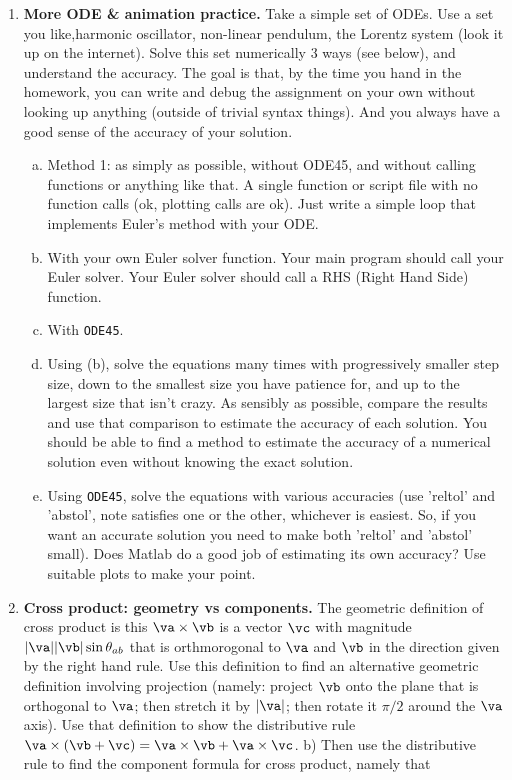 \documentclass[11pt]{article}
\def\tight{ \setlength{\itemsep}{1.5pt}\setlength{\parskip}{0pt}\setlength{\parsep}{0pt}}
\begin{document}
\begin{enumerate}
\begin{enumerate}[\bf a)]
\end{enumerate}

\item {\bf More ODE \& animation practice.}
Take a simple set of ODEs.  Use a set you like,\eg  harmonic oscillator, non-linear pendulum, the Lorentz system (look it up on the internet). Solve this set numerically 3 ways (see below), and understand the accuracy. The goal is that, by the time you hand in the homework, you can write and debug the assignment on your own without looking up anything (outside of trivial syntax things). And you always have a good sense of the accuracy of your solution.
\begin{enumerate}[a.]\tight
\item Method 1:  as simply as possible, without ODE45, and without calling functions or anything like that.  A single function or script file with no function calls (ok, plotting calls are ok). Just write a simple loop that implements Euler's method with your ODE.

\item  With your own Euler solver function.  Your main program should call your Euler solver. Your Euler solver should call a RHS (Right Hand Side) function.

\item With {\tt ODE45}.

\item  Using (b), solve the equations many times with progressively smaller step size, down to the smallest size you
have patience for, and up to the largest size that isn't crazy.  As sensibly as possible,
compare the results and use that comparison to estimate the accuracy of each solution.  You should be able to find a method to estimate the accuracy of a numerical solution even without knowing the exact solution.

\item  Using {\tt ODE45},  solve the equations with various accuracies (use 'reltol' and 'abstol', note \matlab satisfies one or the other, whichever is easiest.  So, if you want an accurate solution you need to make both 'reltol' and 'abstol' small).  Does Matlab do a good job of estimating its own accuracy?  Use suitable plots to make your point.


\end{enumerate}





\item  \textbf{Cross product: geometry vs components.} The geometric definition of cross product is this  $\va \times \vb$ is a vector $\vc$ with magnitude
$|\va||\vb|\sin \theta_{ab}$ that is orthmorogonal to $\va$ and $\vb$ in the direction given by the
right hand rule.   Use this definition to find an alternative geometric definition involving projection 
(namely: project $\vb$ onto the plane that is orthogonal to $\va$; then stretch it by $|\va|$; then rotate it $\pi/2$ around the $\va$ axis). 
Use that definition to  show the distributive rule $\va\times (\vb + \vc) = \va\times\vb + \va\times\vc$.  b) Then use the distributive rule  to find the component formula for cross product, namely that


\end{enumerate}
\end{document}
